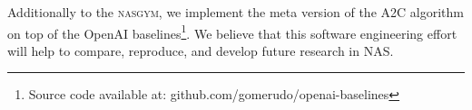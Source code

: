 Additionally to the \textsc{nasgym}, we implement the meta version of the A2C algorithm on top of the OpenAI baselines\footnote{Source code available at: github.com/gomerudo/openai-baselines}. We believe that this software engineering effort will help to compare, reproduce, and develop future research in NAS.
